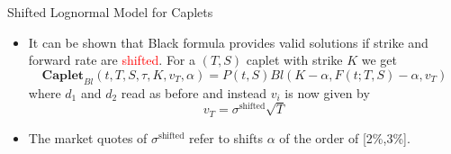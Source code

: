 \documentclass{beamer}
\begin{document}
\begin{frame}{Shifted Lognormal Model for Caplets}
\begin{itemize}
	\item It can be shown that Black formula provides valid solutions if strike and forward rate are \textcolor{red}{shifted}. For a $(T,S)$ caplet with strike $K$ we get
	\begin{equation}
		\textbf{Caplet}_{Bl}(t,T,S,\tau,K,v_T,\alpha) = P(t,S) Bl(K-\alpha,F(t;T,S)-\alpha,v_T)
	\end{equation}
	where $d_1$ and $d_2$ read as before and instead $v_i$ is now given by
	\begin{equation*}
		v_T = \sigma^{\text{shifted}}\sqrt{T}
	\end{equation*}
	\item The market quotes of $\sigma^{\text{shifted}}$ refer to shifts $\alpha$ of the order of [2\%,3\%].
\end{itemize}
\end{frame}

\end{document}
